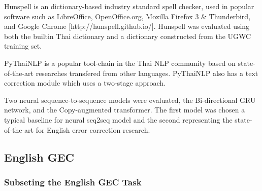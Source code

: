 Hunspell is an dictionary-based industry standard spell checker, used in popular software such as LibreOffice, OpenOffice.org, Mozilla Firefox 3 \& Thunderbird, and Google Chrome [http://hunspell.github.io/]. Hunspell was evaluated using both the builtin Thai dictionary and a dictionary constructed from the UGWC training set. 

PyThaiNLP is a popular tool-chain in the Thai NLP community based on state-of-the-art researches transfered from other languages. PyThaiNLP also has a text correction module which uses a two-stage approach.

Two neural sequence-to-sequence models were evaluated, the Bi-directional GRU network, and the Copy-augmented transformer. The first model was chosen a typical baseline for neural seq2seq model and the second representing the state-of-the-art for English error correction research.

\subsection{English GEC}

\subsubsection{Subseting the English GEC Task}